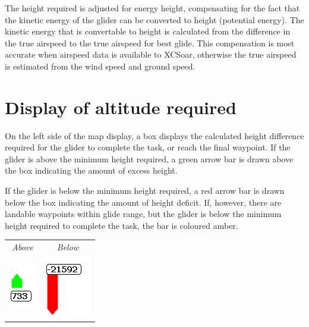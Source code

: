 The height required is adjusted for energy height, compensating for
the fact that the kinetic energy of the glider can be converted to
height (potential energy).  The kinetic energy that is convertable to
height is calculated from the difference in the true airspeed to the
true airspeed for best glide.  This compensation is most accurate when
airspeed data is available to XCSoar, otherwise the true airspeed is
estimated from the wind speed and ground speed.

\section{Display of altitude required}

On the left side of the map display, a box displays the calculated
height difference required for the glider to complete the task, or
reach the final waypoint.  If the glider is above the minimum height
required, a green arrow bar is drawn above the box indicating the
amount of excess height.

If the glider is below the minimum height required, a red arrow bar is
drawn below the box indicating the amount of height deficit.  If,
however, there are landable waypoints within glide range, but the
glider is below the minimum height required to complete the task, the
bar is coloured amber.

\begin{center}
\begin{tabular}{c c}
{\it Above} & {\it Below} \\
\includegraphics[angle=0,width=0.15\linewidth,keepaspectratio='true']{figures/cut-fg-above.png} &
\includegraphics[angle=0,width=0.2\linewidth,keepaspectratio='true']{figures/cut-fg-below.png} \\
\end{tabular}
\end{center}

